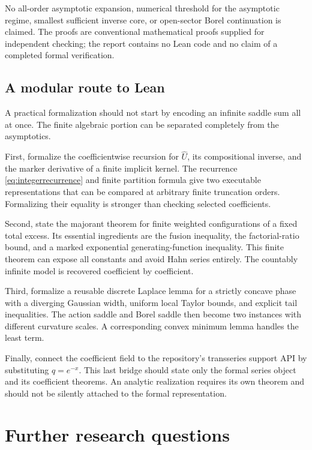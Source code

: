 \documentclass[11pt,a4paper]{article}
\numberwithin{equation}{section}
\theoremstyle{definition}\newtheorem{definition}[theorem]{Definition}
\theoremstyle{remark}\newtheorem{remark}[theorem]{Remark}
\theoremstyle{definition}
\newcommand{\U}{\widehat U}
\begin{document}
No all-order asymptotic expansion, numerical threshold for the asymptotic
regime, smallest sufficient inverse core, or open-sector Borel continuation
is claimed. The proofs are conventional mathematical proofs supplied for
independent checking; the report contains no Lean code and no claim of a
completed formal verification.

\subsection{A modular route to Lean}
A practical formalization should not start by encoding an infinite saddle
sum all at once. The finite algebraic portion can be separated completely
from the asymptotics.

First, formalize the coefficientwise recursion for \(\U\), its compositional
inverse, and the marker derivative of a finite implicit kernel. The
recurrence \eqref{eq:integerrecurrence} and finite partition formula give
two executable representations that can be compared at arbitrary finite
truncation orders. Formalizing their equality is stronger than checking
selected coefficients.

Second, state the majorant theorem for finite weighted configurations of
a fixed total excess. Its essential ingredients are the fusion inequality,
the factorial-ratio bound, and a marked exponential generating-function
inequality. This finite theorem can expose all constants and avoid Hahn
series entirely. The countably infinite model is recovered coefficient by
coefficient.

Third, formalize a reusable discrete Laplace lemma for a strictly concave
phase with a diverging Gaussian width, uniform local Taylor bounds, and
explicit tail inequalities. The action saddle and Borel saddle then become
two instances with different curvature scales. A corresponding convex
minimum lemma handles the least term.

Finally, connect the coefficient field to the repository's transseries
support API by substituting \(q=e^{-x}\). This last bridge should state
only the formal series object and its coefficient theorems. An analytic
realization requires its own theorem and should not be silently attached
to the formal representation.

\section{Further research questions}
\label{sec:questions}
\end{document}
